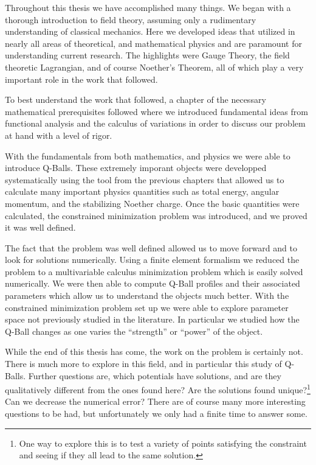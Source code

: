 Throughout this thesis we have accomplished many things. We began with a thorough introduction to field theory, assuming only a rudimentary understanding of classical mechanics. Here we developed ideas that utilized in nearly all areas of theoretical, and mathematical physics and are paramount for understanding current research. The highlights were Gauge Theory, the field theoretic Lagrangian, and of course Noether's Theorem, all of which play a very important role in the work that followed.

To best understand the work that followed, a chapter of the necessary mathematical prerequisites followed where we introduced fundamental ideas from functional analysis and the calculus of variations in order to discuss our problem at hand with a level of rigor.

With the fundamentals from both mathematics, and physics we were able to introduce Q-Balls. These extremely imporant objects were developped systematically using the tool from the previous chapters that allowed us to calculate many important physics quantities such as total energy, angular momentum, and the stabilizing Noether charge. Once the basic quantities were calculated, the constrained minimization problem was introduced, and we proved it was well defined.

The fact that the problem was well defined allowed us to move forward and to look for solutions numerically. Using a finite element formalism we reduced the problem to a multivariable calculus minimization problem which is easily solved numerically. We were then able to compute Q-Ball profiles and their associated parameters which allow us to understand the objects much better. With the constrained minimization problem set up we were able to explore parameter space not previously studied in the literature. In particular we studied how the Q-Ball changes as one varies the ``strength'' or ``power'' of the object.

While the end of this thesis has come, the work on the problem is certainly not. There is much more to explore in this field, and in particular this study of Q-Balls. Further questions are, which potentials have solutions, and are they qualitatively different from the ones found here? Are the solutions found unique?\footnote{One way to explore this is to test a variety of points satisfying the constraint and seeing if they all lead to the same solution.} Can we decrease the numerical error? There are of course many more interesting questions to be had, but unfortunately we only had a finite time to answer some.